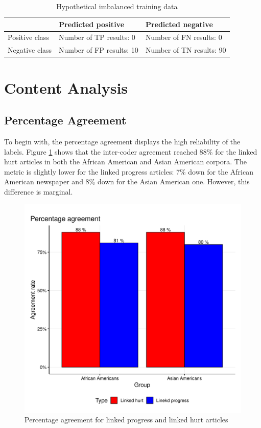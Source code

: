 \documentclass[12 pt]{article}
\begin{document}
\begin{table}[htbp!]
	\centering
	\caption{Hypothetical imbalanced training data}
	\label{tab:evaluations}
	\begin{tabularx}{\textwidth}{ X | X | X}
		\toprule
		 & Predicted positive & Predicted negative \\ \midrule
		Positive class & Number of TP results: 0 & Number of FN results: 0 \\ \hline
		Negative class & Number of FP results: 10 & Number of TN results: 90 \\ \hline 
		\bottomrule
	\end{tabularx}
\end{table}

\section{Content Analysis}

\subsection{Percentage Agreement}
To begin with, the percentage agreement displays the high reliability of the labels. Figure \ref{fig:percentage_agreement} shows that the inter-coder agreement reached 88\% for the linked hurt articles in both the African American and Asian American corpora. The metric is slightly lower for the linked progress articles: 7\% down for the African American newspaper and 8\% down for the Asian American one. However, this difference is marginal.

\begin{figure}[htbp!]
    \centering
    \includegraphics[width=0.6\linewidth]{content_analysis_agreement.png}
    \caption{Percentage agreement for linked progress and linked hurt articles}
    \label{fig:percentage_agreement}
\end{figure}
\end{document}
